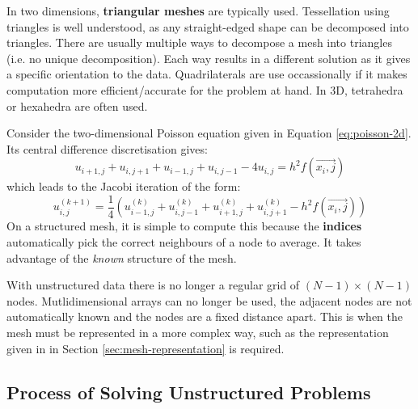 \documentclass{article}
\begin{document}
In two dimensions, \textbf{triangular meshes} are typically used. Tessellation using triangles is well understood, as any straight-edged shape can be decomposed into triangles. There are usually multiple ways to decompose a mesh into triangles (i.e. no unique decomposition). Each way results in a different solution as it gives a specific orientation to the data. Quadrilaterals are use occassionally if it makes computation more efficient/accurate for the problem at hand. In 3D, tetrahedra or hexahedra are often used.

Consider the two-dimensional Poisson equation given in Equation \ref{eq:poisson-2d}. Its central difference discretisation gives:
\begin{equation}
u_{i+1,j} + u_{i,j+1} + u_{i-1,j} + u_{i,j-1} - 4u_{i,j} = h^2f(\vec{x_i,j})
\end{equation}
which leads to the Jacobi iteration of the form:
\begin{equation}
u_{i,j}^{(k+1)} = \frac{1}{4} \left( u_{i-1,j}^{(k)} + u_{i,j-1}^{(k)} + u_{i+1,j}^{(k)} + u_{i,j+1}^{(k)} - h^2f(\vec{x_i,j}) \right)
\end{equation}
On a structured mesh, it is simple to compute this because the \textbf{indices} automatically pick the correct neighbours of a node to average. It takes advantage of the \textit{known} structure of the mesh.

With unstructured data there is no longer a regular grid of $(N - 1) \times (N - 1)$ nodes. Mutlidimensional arrays can no longer be used, the adjacent nodes are not automatically known and the nodes are a fixed distance apart. This is when the mesh must be represented in a more complex way, such as the representation given in in Section \ref{sec:mesh-representation} is required.

\subsection{Process of Solving Unstructured Problems}
\end{document}
